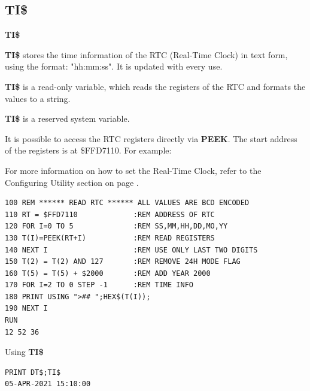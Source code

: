 \subsection{TI\$}
\begin{description}[leftmargin=2cm,style=nextline]
\item [Format:] {\bf TI\$}
\item [Usage:]  {\bf TI\$} stores the time information of the RTC
                (Real-Time Clock) in text form, using the format:
                "hh:mm:ss". It is updated with every use.

                {\bf TI\$} is a read-only variable, which
                reads the registers of the RTC and formats the values
                to a string.

\item [Remarks:]
                {\bf TI\$} is a reserved system variable.

                It is possible to access the RTC registers directly
                via {\bf PEEK}. The start address of the registers is at
                \$FFD7110. For example:

                For more information on how to set the Real-Time Clock,
                refer to the Configuring Utility section on page
                \pageref{sec:configuration-utility}.

\begin{tcolorbox}[colback=black,coltext=white]
\verbatimfont{\codefont}
\begin{verbatim}
100 REM ****** READ RTC ****** ALL VALUES ARE BCD ENCODED
110 RT = $FFD7110             :REM ADDRESS OF RTC
120 FOR I=0 TO 5              :REM SS,MM,HH,DD,MO,YY
130 T(I)=PEEK(RT+I)           :REM READ REGISTERS
140 NEXT I                    :REM USE ONLY LAST TWO DIGITS
150 T(2) = T(2) AND 127       :REM REMOVE 24H MODE FLAG
160 T(5) = T(5) + $2000       :REM ADD YEAR 2000
170 FOR I=2 TO 0 STEP -1      :REM TIME INFO
180 PRINT USING ">## ";HEX$(T(I));
190 NEXT I
RUN
12 52 36
\end{verbatim}
\end{tcolorbox}

\item [Example:] Using {\bf TI\$}
\begin{tcolorbox}[colback=black,coltext=white]
\verbatimfont{\codefont}
\begin{verbatim}
PRINT DT$;TI$
05-APR-2021 15:10:00
\end{verbatim}
\end{tcolorbox}
\end{description}

